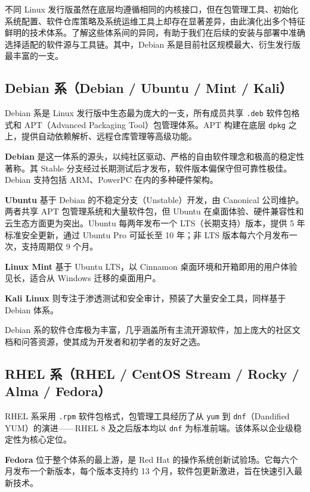 \documentclass[12pt,UTF8]{ctexbook}
\begin{document}
不同 Linux 发行版虽然在底层均遵循相同的内核接口，但在包管理工具、初始化系统配置、软件仓库策略及系统运维工具上却存在显著差异，由此演化出多个特征鲜明的技术体系。了解这些体系间的异同，有助于我们在后续的安装与部署中准确选择适配的软件源与工具链。其中，Debian 系是目前社区规模最大、衍生发行版最丰富的一支。

\subsection{Debian 系（Debian / Ubuntu / Mint / Kali）}

Debian 系是 Linux 发行版中生态最为庞大的一支，所有成员共享 \texttt{.deb} 软件包格式和 APT（Advanced Packaging Tool）包管理体系。APT 构建在底层 \texttt{dpkg} 之上，提供自动依赖解析、远程仓库管理等高级功能。

\textbf{Debian} 是这一体系的源头，以纯社区驱动、严格的自由软件理念和极高的稳定性著称。其 Stable 分支经过长期测试后才发布，软件版本偏保守但可靠性极佳。Debian 支持包括 ARM、PowerPC 在内的多种硬件架构。

\textbf{Ubuntu} 基于 Debian 的不稳定分支（Unstable）开发，由 Canonical 公司维护。两者共享 APT 包管理系统和大量软件包，但 Ubuntu 在桌面体验、硬件兼容性和云生态方面更为突出。Ubuntu 每两年发布一个 LTS（长期支持）版本，提供 5 年标准安全更新，通过 Ubuntu Pro 可延长至 10 年；非 LTS 版本每六个月发布一次，支持周期仅 9 个月。

\textbf{Linux Mint} 基于 Ubuntu LTS，以 Cinnamon 桌面环境和开箱即用的用户体验见长，适合从 Windows 迁移的桌面用户。

\textbf{Kali Linux} 则专注于渗透测试和安全审计，预装了大量安全工具，同样基于 Debian 体系。

Debian 系的软件仓库极为丰富，几乎涵盖所有主流开源软件，加上庞大的社区文档和问答资源，使其成为开发者和初学者的友好之选。    

\subsection{RHEL 系（RHEL / CentOS Stream / Rocky / Alma / Fedora）}

RHEL 系采用 \texttt{.rpm} 软件包格式，包管理工具经历了从 \texttt{yum} 到 \texttt{dnf}（Dandified YUM）的演进——RHEL 8 及之后版本均以 \texttt{dnf} 为标准前端。该体系以企业级稳定性为核心定位。

\textbf{Fedora} 位于整个体系的最上游，是 Red Hat 的操作系统创新试验场。它每六个月发布一个新版本，每个版本支持约 13 个月，软件包更新激进，旨在快速引入最新技术。
\end{document}
